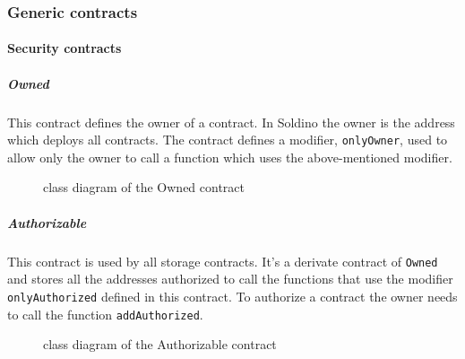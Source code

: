 \subsubsection{Generic contracts}
\paragraph{Security contracts}
\subparagraph{Owned}
This contract defines the owner of a contract. In Soldino the owner is the address which deploys all contracts. The contract defines a modifier, \texttt{onlyOwner}, used to allow only the owner to call a function which uses 
the above-mentioned modifier.
\begin{figure}[H]
	\centering
	\caption{class diagram of the Owned contract}
\end{figure}

\subparagraph{Authorizable}
This contract is used by all storage contracts. It's a derivate contract of \texttt{Owned} and stores 
all the addresses authorized to call the functions that use the modifier \texttt{onlyAuthorized} defined in this contract.
To authorize a contract the owner needs to call the function \texttt{addAuthorized}.
\begin{figure}[H]
	\centering
	\caption{class diagram of the Authorizable contract}
\end{figure}

